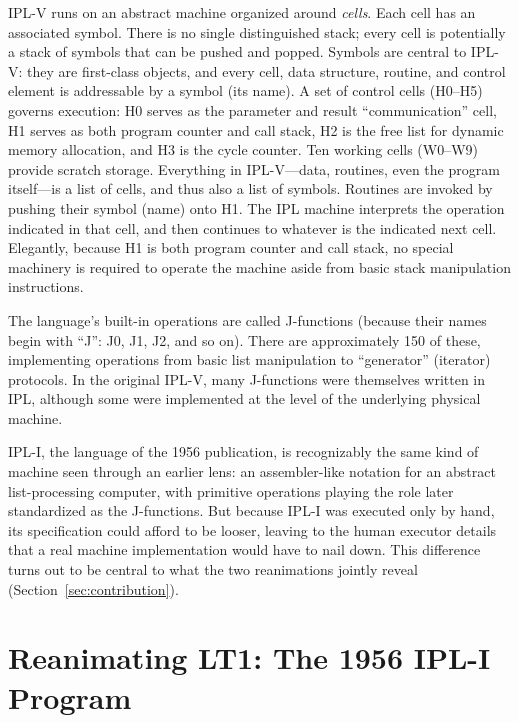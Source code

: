 \documentclass[journal]{IEEEtran}
\begin{document}
IPL-V runs on an abstract machine organized around \textit{cells}.
Each cell has an associated symbol. There is no single distinguished
stack; every cell is potentially a stack of symbols that can be pushed
and popped. Symbols are central to IPL-V: they are first-class
objects, and every cell, data structure, routine, and control element
is addressable by a symbol (its name). A set of control cells
(H0--H5) governs execution: H0 serves as the parameter and result
``communication'' cell, H1 serves as both program counter and call
stack, H2 is the free list for dynamic memory allocation, and H3 is
the cycle counter. Ten working cells (W0--W9) provide scratch
storage. Everything in IPL-V---data, routines, even the program
itself---is a list of cells, and thus also a list of symbols. Routines
are invoked by pushing their symbol (name) onto H1. The IPL machine
interprets the operation indicated in that cell, and then continues to
whatever is the indicated next cell. Elegantly, because H1 is both
program counter and call stack, no special machinery is required to
operate the machine aside from basic stack manipulation instructions.

The language's built-in operations are called J-functions (because
their names begin with ``J'': J0, J1, J2, and so on). There are
approximately 150 of these, implementing operations from basic list
manipulation to ``generator'' (iterator) protocols. In the original
IPL-V, many J-functions were themselves written in IPL, although some
were implemented at the level of the underlying physical machine.

IPL-I, the language of the 1956 publication, is recognizably the same
kind of machine seen through an earlier lens: an assembler-like
notation for an abstract list-processing computer, with primitive
operations playing the role later standardized as the J-functions.
But because IPL-I was executed only by hand, its specification could
afford to be looser, leaving to the human executor details that a real
machine implementation would have to nail down. This difference turns
out to be central to what the two reanimations jointly reveal
(Section~\ref{sec:contribution}).

\section{Reanimating LT1: The 1956 IPL-I Program}
\label{sec:lt1}

\end{document}
